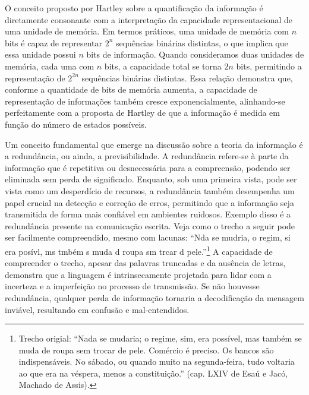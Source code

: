 O conceito proposto por Hartley sobre a quantificação da informação é
diretamente consonante com a interpretação da capacidade representacional de
uma unidade de memória. Em termos práticos, uma unidade de memória com $n$ bits
é capaz de representar $2^n$ sequências binárias distintas, o que implica que
essa unidade possui $n$ bits de informação. Quando consideramos duas unidades
de memória, cada uma com $n$ bits, a capacidade total se torna $2n$ bits,
permitindo a representação de $2^{2n}$ sequências binárias distintas. Essa
relação demonstra que, conforme a quantidade de bits de memória aumenta, a
capacidade de representação de informações também cresce exponencialmente,
alinhando-se perfeitamente com a proposta de Hartley de que a informação é
medida em função do número de estados possíveis.

Um conceito fundamental que emerge na discussão sobre a teoria da informação é
a redundância, ou ainda, a previsibilidade. A redundância refere-se à parte da
informação que é repetitiva ou desnecessária para a compreensão, podendo ser
eliminada sem perda de significado. Enquanto, sob uma primeira vista, pode ser
vista como um desperdício de recursos, a redundância também desempenha um papel
crucial na detecção e correção de erros, permitindo que a informação seja
transmitida de forma mais confiável em ambientes ruidosos. Exemplo disso é a
redundância presente na comunicação escrita. Veja como o trecho a seguir pode
ser facilmente compreendido, mesmo com lacunas: ``Nda se mudria, o regim, si
era posívl, ms tmbém s muda d roupa sm trcar d pele.''\footnote{Trecho origial:
  ``Nada se mudaria; o regime, sim, era possível, mas também se muda de roupa
  sem trocar de pele. Comércio é preciso. Os bancos são indispensáveis. No
  sábado, ou quando muito na segunda-feira, tudo voltaria ao que era na
  véspera, menos a constituição.'' (cap. LXIV de Esaú e Jacó, Machado de
Assis).} A capacidade de compreender o trecho, apesar das palavras truncadas e
da ausência de letras, demonstra que a linguagem é intrinsecamente projetada
para lidar com a incerteza e a imperfeição no processo de transmissão. Se não
houvesse redundância, qualquer perda de informação tornaria a decodificação da
mensagem inviável, resultando em confusão e mal-entendidos.

